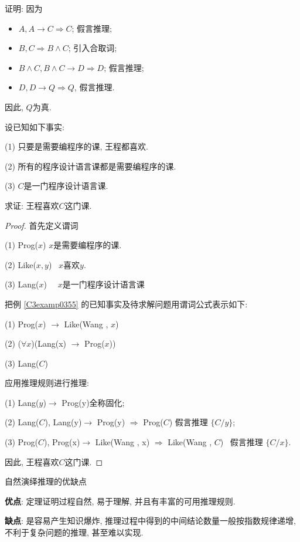 证明: 因为
\begin{itemize}
    \item $A, A\rightarrow C\Rightarrow  C$;                   假言推理;
    \item $B,  C\Rightarrow  B\wedge C$;                       引入合取词;
    \item $B\wedge C, B\wedge C\rightarrow D \Rightarrow  D$;  假言推理;
    \item $D,  D\rightarrow Q \Rightarrow Q$,                  假言推理.
\end{itemize}
因此, $Q$为真.
\begin{example}
设已知如下事实:

\quad   (1) 只要是需要编程序的课, 王程都喜欢.

\quad   (2) 所有的程序设计语言课都是需要编程序的课.

\quad   (3) $C$是一门程序设计语言课.

求证: 王程喜欢$C$这门课.
\end{example}

\begin{proof}
首先定义谓词

\quad   (1) Prog($x$)   \qquad\quad\quad    $x$是需要编程序的课.

\quad   (2) Like($x, y$)\,\,\,    $x$喜欢$y$.

\quad   (3) Lang($x$)   \,\,\,\,    $x$是一门程序设计语言课

把例 \ref{C3examp0355} 的已知事实及待求解问题用谓词公式表示如下:

\quad   (1) Prog($x$) $\rightarrow$ Like(Wang , $x$)

\quad   (2) ($\forall x$)(Lang(x) $\rightarrow$ Prog($x$))

\quad   (3) Lang($C$)

应用推理规则进行推理:

\quad   (1) Lang($y$)$\rightarrow$ Prog(y)\qquad\qquad\qquad\qquad\qquad\qquad\qquad             全称固化;

\quad   (2) Lang($C$), Lang(y)$\rightarrow$ Prog(y) $\Rightarrow$  Prog($C$) \qquad\qquad\qquad  假言推理  $\{C/y\}$;

\quad   (3) Prog($C$),  Prog(x)$\rightarrow$ Like(Wang , x) $\Rightarrow$  Like(Wang , $C$)\,\,\,  假言推理 $ \{C/x\}$.

因此, 王程喜欢$C$这门课.
\end{proof}

\begin{remark}自然演绎推理的优缺点

\textcolor[rgb]{0,0,1}{\textbf{优点}}: 定理证明过程自然, 易于理解, 并且有丰富的可用推理规则.

\textcolor[rgb]{0,0,1}{\textbf{缺点}}: 是容易产生知识爆炸, 推理过程中得到的中间结论数量一般按指数规律递增, 不利于复杂问题的推理, 甚至难以实现.
\end{remark}
